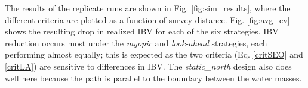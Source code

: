 \documentclass[aoas]{imsart}
\begin{document}
The results of the replicate runs are shown in Fig. \ref{fig:sim_results}, where
the different criteria are plotted as a function of survey
distance. Fig. \ref{fig:avg_ev} shows the resulting drop in realized IBV for
each of the six strategies. IBV reduction occurs most under the
\textit{myopic} and \textit{look-ahead} strategies, each performing
almost equally; this is expected as the two criteria
(Eq. \eqref{critSEQ} and \eqref{critLA}) are sensitive to differences
in IBV. The \textit{static\_north} design also does well here because
the path is parallel to the boundary between the water masses.

\begin{figure}[h!]
  \centering
  \hfill
  \hfill 

\end{figure}
\end{document}
